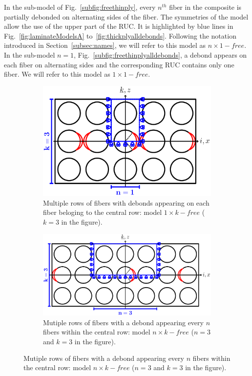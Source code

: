 \documentclass[review]{elsarticle}
\begin{document}
In the sub-model of Fig.~\ref{subfig:freethinply}, every $n^{th}$ fiber in the composite is partially debonded on alternating sides of the fiber. The symmetries of the model allow the use of the upper part of the RUC. It is highlighted by blue lines in Fig.~\ref{fig:laminateModelsA} to~\ref{fig:thickplyalldebonds}. Following the notation introduced in Section~\ref{subsec:names}, we will refer to this model as $n\times 1-free$. In the sub-model $n=1$, Fig.~\ref{subfig:freethinplyalldebonds}, a debond appears on each fiber on alternating sides and the corresponding RUC contains only one fiber. We will refer to this model as $1\times 1-free$.

\begin{figure}[!h]
\centering
    \begin{subfigure}[b]{\textwidth}
    \centering
        \includegraphics[height=0.3\textheight]{thickPlycentraldebondsline.pdf}
        \caption{Multiple rows of fibers with debonds appearing on each fiber beloging to the central row: model $1\times k-free$ ($k=3$ in the figure).}\label{subfig:thickplycentraldebonds}
    \end{subfigure}

    \begin{subfigure}[b]{\textwidth}
        \includegraphics[width=\textwidth]{thickPly.pdf}
        \caption{Mutiple rows of fibers with a debond appearing every $n$ fibers within the central row: model $n\times k-free$ ($n=3$ and $k=3$ in the figure).}\label{subfig:thickply}
    \end{subfigure}


\end{figure}
\end{document}
